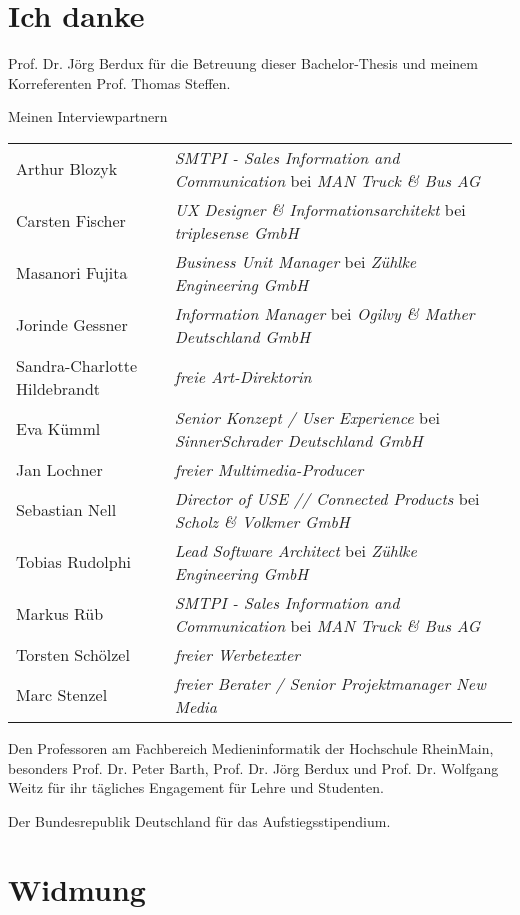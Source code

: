 \documentclass[11pt,a4paper]{article}
\begin{document}
\vspace{1cm}

\pagebreak

\section*{Ich danke}

Prof. Dr. Jörg Berdux für die Betreuung dieser Bachelor-Thesis und meinem Korreferenten Prof. Thomas Steffen.

Meinen Interviewpartnern

\begin{tabular}{@{}l l}
Arthur Blozyk & \emph{SMTPI - Sales Information and Communication} bei \emph{MAN Truck \& Bus AG}\\
Carsten Fischer & \emph{UX Designer \& Informationsarchitekt} bei \emph{triplesense GmbH}\\
Masanori Fujita & \emph{Business Unit Manager} bei \emph{Zühlke Engineering GmbH}\\
Jorinde Gessner & \emph{Information Manager} bei \emph{Ogilvy \& Mather Deutschland GmbH}\\
Sandra-Charlotte Hildebrandt & \emph{freie Art-Direktorin}\\
Eva Kümml & \emph{Senior Konzept / User Experience} bei \emph{SinnerSchrader Deutschland GmbH}\\
Jan Lochner & \emph{freier Multimedia-Producer}\\
Sebastian Nell & \emph{Director of USE // Connected Products} bei \emph{Scholz \& Volkmer GmbH}\\
Tobias Rudolphi & \emph{Lead Software Architect} bei \emph{Zühlke Engineering GmbH}\\
Markus Rüb & \emph{SMTPI - Sales Information and Communication} bei \emph{MAN Truck \& Bus AG}\\
Torsten Schölzel & \emph{freier Werbetexter}\\
Marc Stenzel & \emph{freier Berater / Senior Projektmanager New Media}
\end{tabular}

Den Professoren am Fachbereich Medieninformatik der Hochschule RheinMain, besonders Prof. Dr. Peter Barth, Prof. Dr. Jörg Berdux und Prof. Dr. Wolfgang Weitz für ihr tägliches Engagement für Lehre und Studenten.

Der Bundesrepublik Deutschland für das Aufstiegsstipendium.

\section*{Widmung}
\end{document}
